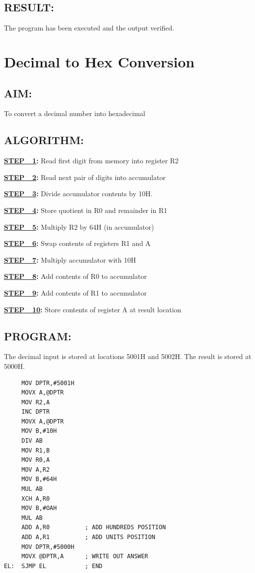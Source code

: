 \documentclass[a4paper,28pt]{report}
\begin{document}
\section*{RESULT:}
The program has been executed and the output verified.
\chapter{Decimal to Hex Conversion}
\section*{AIM:}
To convert a decimal number into hexadecimal

\section*{ALGORITHM:}

\textbf{\underline{STEP\ \ 1}:} Read first digit from memory into register R2

\textbf{\underline{STEP\ \ 2}:} Read next pair of digits into accumulator

\textbf{\underline{STEP\ \ 3}:} Divide accumulator contents by 10H.

\textbf{\underline{STEP\ \ 4}:} Store quotient in R0 and remainder in R1

\textbf{\underline{STEP\ \ 5}:} Multiply R2 by 64H (in accumulator)

\textbf{\underline{STEP\ \ 6}:} Swap contents of registers R1 and A

\textbf{\underline{STEP\ \ 7}:} Multiply accumulator with 10H

\textbf{\underline{STEP\ \ 8}:} Add contents of R0 to accumulator

\textbf{\underline{STEP\ \ 9}:} Add contents of R1 to accumulator

\textbf{\underline{STEP\ \ 10}:} Store contents of register A at result location

\section*{PROGRAM:}
The decimal input is stored at locations 5001H and 5002H. The result is stored at 5000H.

\begin{lstlisting}
     MOV DPTR,#5001H
     MOVX A,@DPTR
     MOV R2,A
     INC DPTR
     MOVX A,@DPTR
     MOV B,#10H
     DIV AB
     MOV R1,B
     MOV R0,A
     MOV A,R2
     MOV B,#64H
     MUL AB
     XCH A,R0
     MOV B,#OAH
     MUL AB
     ADD A,R0          ; ADD HUNDREDS POSITION
     ADD A,R1          ; ADD UNITS POSITION
     MOV DPTR,#5000H
     MOVX @DPTR,A      ; WRITE OUT ANSWER
EL:  SJMP EL           ; END
\end{lstlisting}
\end{document}
